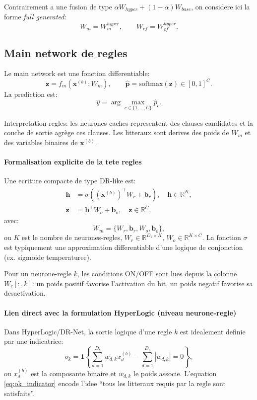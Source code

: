\documentclass[11pt,a4paper]{article}
\begin{document}
Contrairement a une fusion de type $\alpha W_{hyper}+(1-\alpha)W_{base}$,
on considere ici la forme \emph{full generated}:
\[
W_m=W_m^{hyper},\qquad W_{cf}=W_{cf}^{hyper}.
\]

\subsection{Main network de regles}
Le main network est une fonction differentiable:
\[
\bm{z}=f_m(\bm{x}^{(b)};W_m),\qquad
\hat{\bm{p}}=\text{softmax}(\bm{z})\in[0,1]^C.
\]
La prediction est:
\[
\hat{y}=\arg\max_{c\in\{1,\dots,C\}} \hat{p}_c.
\]

Interpretation regles:
les neurones caches representent des clauses candidates et la couche de sortie agrège ces clauses.
Les litteraux sont derives des poids de $W_m$ et des variables binaires de $\bm{x}^{(b)}$.

\paragraph{Formalisation explicite de la tete regles}
Une ecriture compacte de type DR-like est:
\begin{align}
\bm{h} &= \sigma\!\left((\bm{x}^{(b)})^\top W_r + \bm{b}_r\right),\quad \bm{h}\in\mathbb{R}^{K},\\
\bm{z} &= \bm{h}^\top W_o + \bm{b}_o,\quad \bm{z}\in\mathbb{R}^{C},
\end{align}
avec:
\[
W_m=\{W_r,\bm{b}_r,W_o,\bm{b}_o\},
\]
ou $K$ est le nombre de neurones-regles, $W_r\in\mathbb{R}^{D_b\times K}$, $W_o\in\mathbb{R}^{K\times C}$.
La fonction $\sigma$ est typiquement une approximation differentiable d'une logique de conjonction
(ex. sigmoide temperaturee).

Pour un neurone-regle $k$, les conditions ON/OFF sont lues depuis la colonne $W_r[:,k]$:
un poids positif favorise l'activation du bit, un poids negatif favorise sa desactivation.

\paragraph{Lien direct avec la formulation HyperLogic (niveau neurone-regle)}
Dans HyperLogic/DR-Net, la sortie logique d'une regle $k$ est idealement definie par une indicatrice:
\begin{equation}
o_k
=\mathbf{1}\!\left\{
\sum_{d=1}^{D_b} w_{d,k}x^{(b)}_d-\sum_{d=1}^{D_b}|w_{d,k}|=0
\right\},
\label{eq:ok_indicator}
\end{equation}
ou $x^{(b)}_d$ est la composante binaire et $w_{d,k}$ le poids associe.
L'equation \eqref{eq:ok_indicator} encode l'idee ``tous les litteraux requis par la regle sont satisfaits''.
\end{document}

